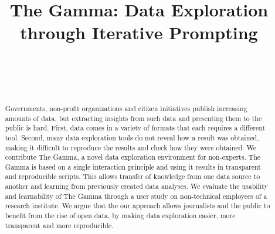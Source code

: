 \documentclass{sigchi}
\def\plaintitle{The Gamma: Data Exploration through Iterative Prompting}
\begin{document}
\title{\plaintitle}

\author{%
  \\
  \\
  \\
}

\maketitle

\begin{abstract}
Governments, non-profit organizations and citizen initiatives publish increasing amounts of
data, but extracting insights from such data and presenting them to the public is hard.
First, data comes in a variety of formats that each requires a different tool. Second, many
data exploration tools do not reveal how a result was obtained, making it difficult to reproduce
the results and check how they were obtained.
%
We contribute The Gamma, a novel data exploration environment for non-experts. The Gamma is based
on a single interaction principle and using it results in transparent and reproducible scripts.
This allows transfer of knowledge from one data source to another and
learning from previously created data analyses. We evaluate the usability and learnability of
The Gamma through a user study on non-technical employees of a research institute.
%
We argue that the our approach allows journalists and the public to benefit from the rise
of open data, by making data exploration easier, more transparent and more reproducible.
\end{abstract}
\end{document}
